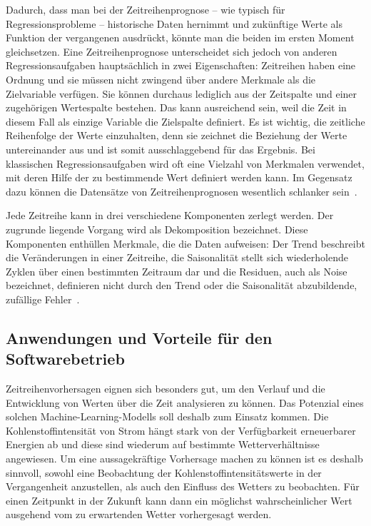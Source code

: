 Dadurch, dass man bei der Zeitreihenprognose -- wie typisch für Regressionsprobleme -- historische Daten hernimmt und zukünftige Werte als Funktion der vergangenen ausdrückt, könnte man die beiden im ersten Moment gleichsetzen.
Eine Zeitreihenprognose unterscheidet sich jedoch von anderen Regressionsaufgaben hauptsächlich in zwei Eigenschaften:
Zeitreihen haben eine Ordnung und sie müssen nicht zwingend über andere Merkmale als die Zielvariable verfügen.
Sie können durchaus lediglich aus der Zeitspalte und einer zugehörigen Wertespalte bestehen.
Das kann ausreichend sein, weil die Zeit in diesem Fall als einzige Variable die Zielspalte definiert.
Es ist wichtig, die zeitliche Reihenfolge der Werte einzuhalten, denn sie zeichnet die Beziehung der Werte untereinander aus und ist somit ausschlaggebend für das Ergebnis.
Bei klassischen Regressionsaufgaben wird oft eine Vielzahl von Merkmalen verwendet, mit deren Hilfe der zu bestimmende Wert definiert werden kann.
Im Gegensatz dazu können die Datensätze von Zeitreihenprognosen wesentlich schlanker sein~\cite{Peixeiro.2022}.

Jede Zeitreihe kann in drei verschiedene Komponenten zerlegt werden.
Der zugrunde liegende Vorgang wird als Dekomposition bezeichnet.
Diese Komponenten enthüllen Merkmale, die die Daten aufweisen:
Der Trend beschreibt die Veränderungen in einer Zeitreihe, die Saisonalität stellt sich wiederholende Zyklen über einen bestimmten Zeitraum dar und die Residuen, auch als Noise bezeichnet, definieren nicht durch den Trend oder die Saisonalität abzubildende, zufällige Fehler~\cite{Peixeiro.2022}.

\subsection{Anwendungen und Vorteile für den Softwarebetrieb}
Zeitreihenvorhersagen eignen sich besonders gut, um den Verlauf und die Entwicklung von Werten über die Zeit analysieren zu können.
Das Potenzial eines solchen Machine-Learning-Modells soll deshalb zum Einsatz kommen.
Die Kohlenstoffintensität von Strom hängt stark von der Verfügbarkeit erneuerbarer Energien ab und diese sind wiederum auf bestimmte Wetterverhältnisse angewiesen.
Um eine aussagekräftige Vorhersage machen zu können ist es deshalb sinnvoll, sowohl eine Beobachtung der Kohlenstoffintensitätswerte in der Vergangenheit anzustellen, als auch den Einfluss des Wetters zu beobachten.
Für einen Zeitpunkt in der Zukunft kann dann ein möglichst wahrscheinlicher Wert ausgehend vom zu erwartenden Wetter vorhergesagt werden.

